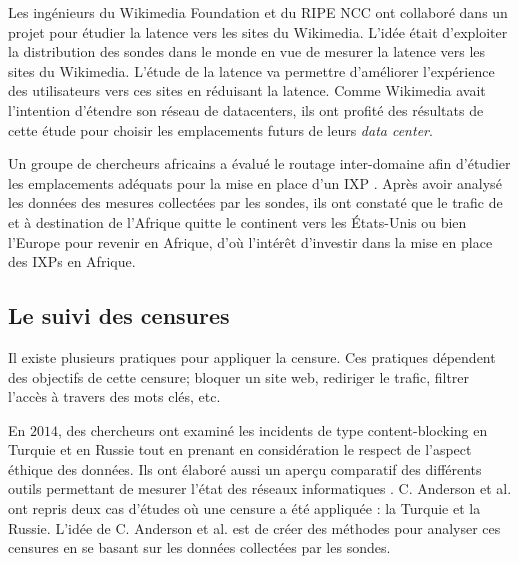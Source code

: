 Les ingénieurs du Wikimedia Foundation et du RIPE NCC ont collaboré dans un projet \cite{Wikipedia} pour étudier la  latence vers les sites  du Wikimedia. L'idée était d'exploiter la distribution des sondes   dans le monde en vue  de mesurer la latence vers les sites du Wikimedia. L'étude de la latence va permettre d'améliorer l'expérience des utilisateurs vers ces sites  en réduisant la latence. Comme Wikimedia avait l'intention d'étendre son réseau de datacenters, ils ont profité des résultats de cette étude pour choisir les  emplacements futurs de leurs \textit{data center}.


Un groupe de chercheurs africains a évalué le routage inter-domaine afin d'étudier les emplacements adéquats pour la mise en place d'un IXP \cite{FANOU-Roderick}. Après avoir analysé les données des mesures collectées par les sondes, ils ont constaté que le trafic de et à destination de l'Afrique quitte le continent vers les États-Unis ou bien  l'Europe pour revenir en Afrique, d'où l'intérêt d'investir dans la mise en place des IXPs en Afrique.  \par


\subsection{Le suivi des censures}

Il existe plusieurs pratiques pour appliquer la censure. Ces pratiques dépendent des objectifs de cette censure; bloquer un site web, rediriger le trafic, filtrer l'accès à travers des mots clés, etc.

En $2014$, des chercheurs ont examiné les incidents de type content-blocking en Turquie et en  Russie tout en prenant en considération le respect de l'aspect éthique des données. Ils ont  élaboré aussi un aperçu comparatif des différents outils permettant de mesurer l'état des réseaux informatiques \cite{Collin-Anderson}. C. Anderson et al. ont repris deux cas d'études où une censure a été appliquée : la Turquie et la Russie. L'idée de C. Anderson et al. est de créer des méthodes pour analyser ces censures en se basant sur les données collectées par les sondes. \par



